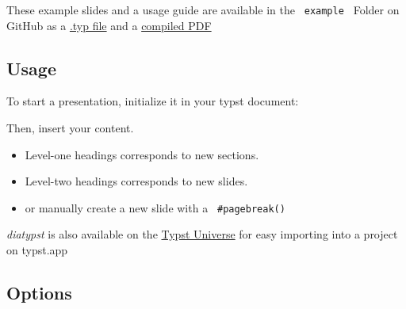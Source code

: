 These example slides and a usage guide are available in the
\texttt{\ example\ } Folder on GitHub as a
\href{https://github.com/skriptum/diatypst/blob/main/example/example.typ}{.typ
file} and a
\href{https://github.com/skriptum/diatypst/blob/main/example/example.pdf}{compiled
PDF}

\subsection{Usage}\label{usage}

To start a presentation, initialize it in your typst document:

\begin{Shaded}
\begin{Highlighting}[]
\NormalTok{)}
\end{Highlighting}
\end{Shaded}

Then, insert your content.

\begin{itemize}
\tightlist
\item
  Level-one headings corresponds to new sections.
\item
  Level-two headings corresponds to new slides.
\item
  or manually create a new slide with a \texttt{\ \#pagebreak()\ }
\end{itemize}

\begin{Shaded}
\begin{Highlighting}[]



\end{Highlighting}
\end{Shaded}

\emph{diatypst} is also available on the
\href{https://typst.app/universe/package/diatypst}{Typst Universe} for
easy importing into a project on typst.app

\subsection{Options}\label{options}

